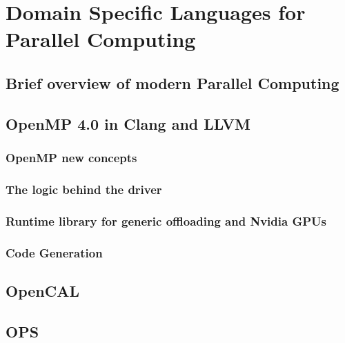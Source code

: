 \chapter{Domain Specific Languages for Parallel Computing}

\section{Brief overview of modern Parallel Computing}

\section{OpenMP 4.0 in Clang and LLVM}


\subsection{OpenMP new concepts}

\subsection{The logic behind the driver}

\subsection{Runtime library for generic offloading and Nvidia GPUs}

\subsection{Code Generation}




\section{OpenCAL}

\section{OPS}
